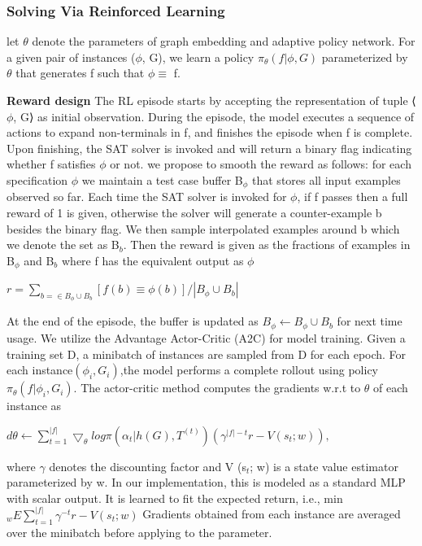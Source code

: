 \documentclass{article}
\begin{document}
\subsubsection{Solving Via Reinforced Learning}
let $\theta$ denote the parameters of graph embedding and adaptive policy network. For a given pair of instances ($\phi$, G), we learn a policy $\pi_\theta(f|\phi,G)$ parameterized by $\theta$ that generates f such that $\phi\equiv$ f.

\textbf{Reward design} The RL episode starts by accepting the representation of tuple ⟨$\phi$, G⟩ as initial observation. During the episode, the model executes a sequence of actions to expand non-terminals in f, and finishes the episode when f is complete. Upon finishing, the SAT solver is invoked and will return a binary flag indicating whether f satisfies $\phi$ or not. we propose to smooth the reward as follows: for each specification $\phi$ we maintain a test case buffer B$_\phi$ that stores all input examples observed so far. Each time the SAT solver is invoked for $\phi$, if f passes then a full reward of 1 is given, otherwise the solver will generate a counter-example b besides the binary flag. We then sample interpolated examples around b which we denote the set as B$_b$. Then the reward is given as the fractions of examples in B$_\phi$ and B$_b$ where f has the equivalent output as $\phi$

\begin{math}
r = {\sum_{b=\in B_\phi\cup B_b} [f(b) \equiv \phi(b)]}/{|B_\phi\cup B_b|}
\end{math}

At the end of the episode, the buffer is updated as $B_\phi \leftarrow B_\phi\cup B_b$ for next time usage. We utilize the Advantage Actor-Critic (A2C) for model training. Given a training set D, a minibatch of instances are sampled from D for each epoch. For each instance$(\phi_i,G_i)$,the model performs a complete rollout using policy $\pi_\theta(f|\phi_i,G_i)$. The actor-critic method computes the gradients w.r.t to $\theta$ of each instance as

\begin{math}
d\theta \leftarrow \sum_{t=1}^{|f|} \bigtriangledown _\theta log\pi(\alpha_t|h(G),T^{(t)})(\gamma^{|f|-t}r-V(s_t;w)),
\end{math}

where $\gamma$ denotes the discounting factor and V (s$_t$; w) is a state value estimator parameterized by w. In our implementation, this is modeled as a standard MLP with scalar output. It is learned to fit the expected return, i.e., min$_w E \sum _{t=1} ^{|f|} \gamma ^{-t}r-V(s_t;w)$ Gradients obtained from each instance are averaged over the minibatch before applying to the parameter.
\end{document}
